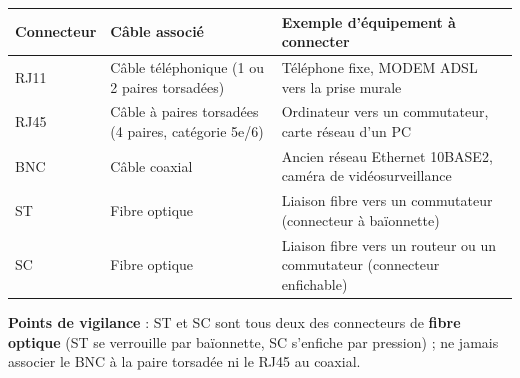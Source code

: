 \documentclass[11pt]{article}
\newcommand{\cle}[1]{{\popxbold\color{popdark}#1}}
\begin{document}
\begin{corrige}
\begin{center}
\begin{tabularx}{\linewidth}{|l|X|X|}
\hline
\rowcolor{popblueL} \textbf{Connecteur} & \textbf{Câble associé} & \textbf{Exemple d'équipement à connecter} \\
\hline
\cle{RJ11} & Câble téléphonique (1 ou 2 paires torsadées) & Téléphone fixe, MODEM ADSL vers la prise murale \\
\hline
\cle{RJ45} & Câble à paires torsadées (4 paires, catégorie 5e/6) & Ordinateur vers un commutateur, carte réseau d'un PC \\
\hline
\cle{BNC} & Câble coaxial & Ancien réseau Ethernet 10BASE2, caméra de vidéosurveillance \\
\hline
\cle{ST} & Fibre optique & Liaison fibre vers un commutateur (connecteur à baïonnette) \\
\hline
\cle{SC} & Fibre optique & Liaison fibre vers un routeur ou un commutateur (connecteur enfichable) \\
\hline
\end{tabularx}
\end{center}
\textbf{Points de vigilance} : \cle{ST} et \cle{SC} sont tous deux des connecteurs de \textbf{fibre optique} (ST se verrouille par baïonnette, SC s'enfiche par pression) ; ne jamais associer le BNC à la paire torsadée ni le RJ45 au coaxial.
\end{corrige}
\end{document}
